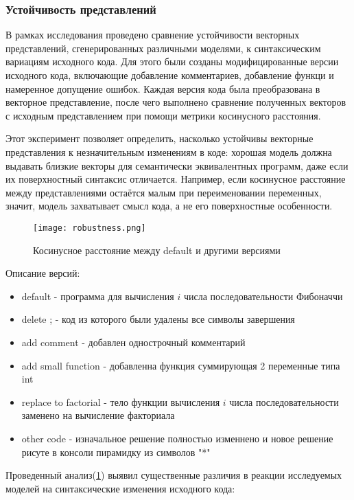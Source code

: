 \documentclass[../part_3.tex]{subfiles}
\begin{document}
\subsubsection{Устойчивость представлений}
\par В рамках исследования проведено сравнение устойчивости векторных представлений, сгенерированных различными моделями, к синтаксическим вариациям исходного кода. Для этого были созданы модифицированные версии исходного кода, включающие добавление комментариев, добавление функци и намеренное допущение ошибок. Каждая версия кода была преобразована в векторное представление, после чего выполнено сравнение полученных векторов с исходным представлением при помощи метрики косинусного расстояния.
\par Этот эксперимент позволяет определить, насколько устойчивы векторные представления к незначительным изменениям в коде: хорошая модель должна выдавать близкие векторы для семантически эквивалентных программ, даже если их поверхностный синтаксис отличается. Например, если косинусное расстояние между представлениями остаётся малым при переименовании переменных, значит, модель захватывает смысл кода, а не его поверхностные особенности.
\begin{figure}[H]
    \centering
    \texttt{[image: robustness.png]}
    \caption{Косинусное расстояние между default и другими версиями}
    \label{fig:robustness}
\end{figure}
\par Описание версий:
\begin{itemize}
    \item default - программа для вычисления $i$ числа последовательности Фибоначчи
    \item delete ; - код из которого были удалены все символы завершения
    \item add comment - добавлен однострочный комментарий
    \item add small function - добавленна функция суммирующая 2 переменные типа int
    \item replace to factorial - тело функции вычисления $i$ числа последовательности заменено на вычисление факториала
    \item other code - изначальное решение полностью изменнено и новое решение рисуте в консоли пирамидку из символов "*"
\end{itemize}
\par Проведенный анализ(\ref{fig:robustness}) выявил существенные различия в реакции исследуемых моделей на синтаксические изменения исходного кода:
\end{document}
